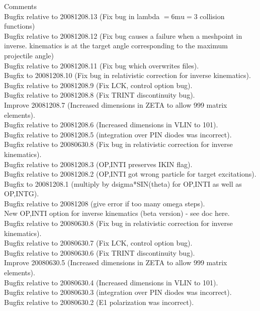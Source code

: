 \documentclass[10pt]{article}
\begin{document}
Comments\\
Bugfix relative to 20081208.13 (Fix bug in lambda $=6 \mathrm{mu}=3$ collision functions)\\
Bugfix relative to 20081208.12 (Fix bug causes a failure when a meshpoint in inverse. kinematics is at the target angle corresponding to the maximum projectile angle)\\
Bugfix relative to 20081208.11 (Fix bug which overwrites files).\\
Bugfix to 20081208.10 (Fix bug in relativistic correction for inverse kinematics).\\
Bugfix relative to 20081208.9 (Fix LCK, control option bug).\\
Bugfix relative to 20081208.8 (Fix TRINT discontinuity bug).\\
Improve 20081208.7 (Increased dimensions in ZETA to allow 999 matrix elements).\\
Bugfix relative to 20081208.6 (Increased dimensions in VLIN to 101).\\
Bugfix relative to 20081208.5 (integration over PIN diodes was incorrect).\\
Bugfix relative to 20080630.8 (Fix bug in relativistic correction for inverse kinematics).\\
Bugfix relative to 20081208.3 (OP,INTI preserves IKIN flag).\\
Bugfix relative to 20081208.2 (OP,INTI got wrong particle for target excitations).\\
Bugfix to 20081208.1 (multiply by dsigma*SIN(theta) for OP,INTI as well as OP,INTG).\\
Bugfix relative to 20081208 (give error if too many omega steps).\\
New OP,INTI option for inverse kinematics (beta version) - see doc here.\\
Bugfix relative to 20080630.8 (Fix bug in relativistic correction for inverse kinematics).\\
Bugfix relative to 20080630.7 (Fix LCK, control option bug).\\
Bugfix relative to 20080630.6 (Fix TRINT discontinuity bug).\\
Improve 20080630.5 (Increased dimensions in ZETA to allow 999 matrix elements).\\
Bugfix relative to 20080630.4 (Increased dimensions in VLIN to 101).\\
Bugfix relative to 20080630.3 (integration over PIN diodes was incorrect).\\
Bugfix relative to 20080630.2 (E1 polarization was incorrect).\\
\end{document}
